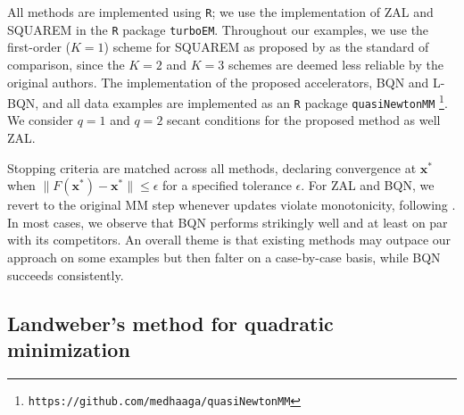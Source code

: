 \documentclass{statsoc}
\newcommand{\bx}{\boldsymbol{x}}
\newcommand{\jx}[1]{{\color{blue}{ #1}}}
\begin{document}
All methods are implemented using \texttt{R}; we use the implementation of  ZAL and SQUAREM in the \texttt{R} package \texttt{turboEM}.  Throughout our examples, we use the first-order ($K=1$) scheme for SQUAREM as proposed by \cite{varadhan2008simple} as the standard of comparison, since the $K=2$ and $K=3$ schemes are deemed less reliable  by the original authors. The implementation of the proposed accelerators, BQN and L-BQN, and all data examples are implemented as an \texttt{R} package \texttt{quasiNewtonMM} \footnote{\texttt{https://github.com/medhaaga/quasiNewtonMM}}. We consider $q=1$ and $q=2$ secant conditions for the proposed method as well ZAL. %


Stopping criteria are matched across all methods, declaring convergence at $\bx^\ast$ when $\|F(\bx^\ast) - \bx^\ast\| \leq \epsilon$ for a specified tolerance $\epsilon$. For ZAL and BQN, we revert to the original MM step whenever updates violate monotonicity, following \citet{zhou2011quasi}. In most cases,
we observe that BQN performs strikingly well and at least on par with its competitors. An overall theme is that existing methods may outpace our approach on some examples but then falter on a case-by-case basis, while BQN succeeds consistently. %


\subsection{Landweber's method for quadratic minimization}

\end{document}

